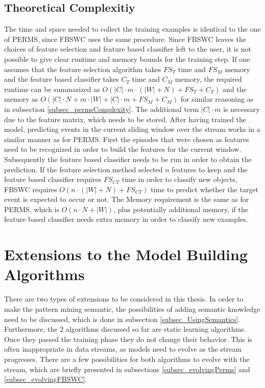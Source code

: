 \subsection{Theoretical Complexitiy}
The time and space needed to collect the training examples is identical to the one of PERMS, since FBSWC uses the same procedure.
Since FBSWC leaves the choices of feature selection and feature based classifier left to the user, it is not possible to give clear runtime and memory bounds for the training step. If one assumes that the feature selection algorithm takes $FS_T$ time and $FS_M$ memory and the feature based classifier takes $C_T$ time and $C_M$ memory, the required runtime can be summarized as $O(|C| \cdot m \cdot(|W| + N) + FS_T + C_T)$ and the memory as $O(|C|\cdot N + m \cdot |W| + |C|\cdot m + FS_M + C_M)$ for similar reasoning as in subsection \ref{subsec_permsComplexity}. The additional term $|C|\cdot m$ is necessary due to the feature matrix, which needs to be stored.
After having trained the model, predicting events in the current sliding window over the stream works in a similar manner as for PERMS. First the episodes that were chosen as features need to be recognized in order to build the features for the current window. Subsequently the feature based classifier needs to be run in order to obtain the prediction. If the feature selection method selected $n$ features to keep and the feature based classifier requires $FS_{CT}$ time in order to classify new objects, FBSWC requires $O(n \cdot (|W|+N) + FS_{CT})$ time to predict whether the target event is expected to occur or not. The Memory requirement is the same as for PERMS, which is $O(n \cdot N + |W|)$, plus potentially additional memory, if the feature based classifier needs extra memory in order to classify new examples.

\section{Extensions to the Model Building Algorithms}
\label{sec_EvolvingModels}

There are two types of extensions to be considered in this thesis. In order to make the pattern mining semantic, the possibilities of adding semantic knowledge need to be discussed, which is done in subsection \ref{subsec_UsingSemantics}. Furthermore, the 2 algorithms discussed so far are static learning algorithms. Once they passed the training phase they do not change their behavior. This is often inappropriate in data streams, as models need to evolve as the stream progresses. There are a few possibilities for both algorithms to evolve with the stream, which are briefly presented in subsections \ref{subsec_evolvingPerms} and \ref{subsec_evolvingFBSWC}.

